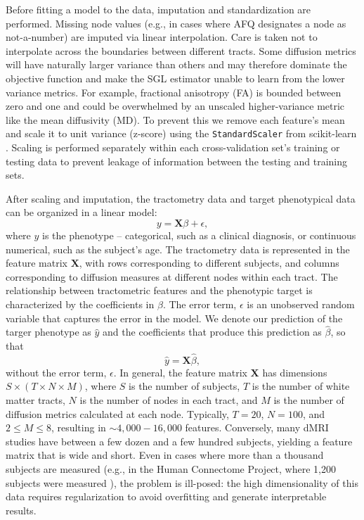 Before fitting a model to the data, imputation and standardization are
performed. Missing node values (e.g., in cases where AFQ designates a node as
not-a-number) are imputed via linear interpolation. Care is taken not to
interpolate across the boundaries between different tracts. Some diffusion
metrics will have naturally larger variance than others and may therefore
dominate the objective function and make the SGL estimator unable to learn from
the lower variance metrics. For example, fractional anisotropy (FA) is bounded
between zero and one and could be overwhelmed by an unscaled higher-variance
metric like the mean diffusivity (MD). To prevent this we remove each feature's
mean and scale it to unit variance (z-score) using the
\lstinline{StandardScaler} from scikit-learn \cite{scikit-learn}. Scaling is
performed separately within each cross-validation set's training or testing data
to prevent leakage of information between the testing and training
sets\cite{kaufman2012leakage}.

After scaling and imputation, the tractometry data and target
phenotypical data can be organized in a linear model:
\begin{equation}
    y = \mathbf{X} \beta + \epsilon,
    \label{eq:lm}
\end{equation}
where $y$ is the phenotype -- categorical, such as a clinical diagnosis,
or continuous numerical, such as the subject's age. The tractometry
data is represented in the feature matrix $\mathbf{X}$, with rows
corresponding to different subjects, and columns corresponding
to diffusion measures at different nodes within each tract. The
relationship between tractometric features and the phenotypic target is
characterized by the coefficients in $\beta$. The error term, $\epsilon$
is an unobserved random variable that captures the error in the model.
We denote our prediction of the targer phenotype as $\hat{y}$ and the
coefficients that produce this prediction as $\hat{\beta}$, so that
\begin{equation}
    \hat{y} = \mathbf{X} \hat{\beta},
    \label{eq:lm-approx}
\end{equation}
without the error term, $\epsilon$. In general, the feature matrix
$\mathbf{X}$ has dimensions $S \times (T \times N \times M)$, where $S$
is the number of subjects, $T$ is the number of white matter tracts,
$N$ is the number of nodes in each tract, and $M$ is the number of
diffusion metrics calculated at each node. Typically, $T = 20$, $N =
100$, and $2 \le M \le 8$, resulting in $\sim 4,000 - 16,000$ features.
Conversely, many dMRI studies have between a few dozen and a few
hundred subjects, yielding a feature matrix that is wide and short.
Even in cases where more than a thousand subjects are measured (e.g.,
in the Human Connectome Project, where 1,200 subjects were measured
\cite{VanEssen2012}), the problem is ill-posed: the high dimensionality
of this data requires regularization to avoid overfitting and generate
interpretable results.

